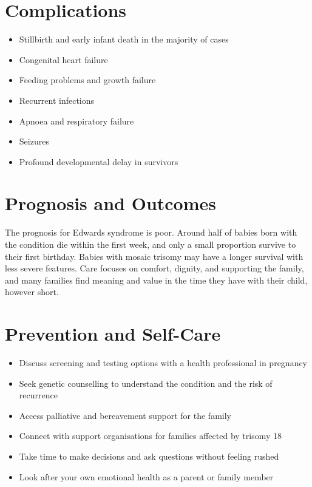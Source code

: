 \section*{Complications}
\begin{itemize}
    \item Stillbirth and early infant death in the majority of cases
    \item Congenital heart failure
    \item Feeding problems and growth failure
    \item Recurrent infections
    \item Apnoea and respiratory failure
    \item Seizures
    \item Profound developmental delay in survivors
\end{itemize}

\section*{Prognosis and Outcomes}
The prognosis for Edwards syndrome is poor. Around half of babies born with the condition die within the first week, and only a small proportion survive to their first birthday. Babies with mosaic trisomy may have a longer survival with less severe features. Care focuses on comfort, dignity, and supporting the family, and many families find meaning and value in the time they have with their child, however short.

\section*{Prevention and Self-Care}
\begin{itemize}
    \item Discuss screening and testing options with a health professional in pregnancy
    \item Seek genetic counselling to understand the condition and the risk of recurrence
    \item Access palliative and bereavement support for the family
    \item Connect with support organisations for families affected by trisomy 18
    \item Take time to make decisions and ask questions without feeling rushed
    \item Look after your own emotional health as a parent or family member
\end{itemize}

